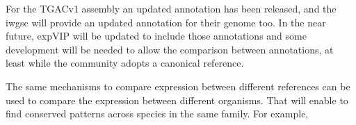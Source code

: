 
For the TGACv1 assembly an updated annotation has been released, and the \acrshort{iwgsc} will provide an updated annotation for their genome too. 
In the near future, expVIP will be updated to include those annotations and some development will be needed to allow the comparison between annotations, at least while the community adopts a canonical reference. 

The same mechanisms to compare expression between different references can be used to compare the expression between different organisms. 
That will enable to find conserved patterns across species in the same family. 
For example, 

